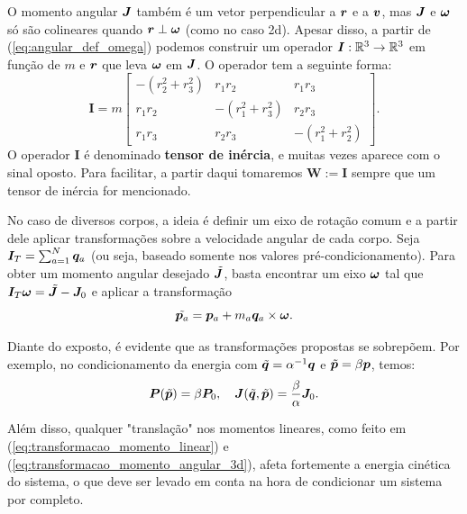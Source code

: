 O momento angular $\bm J$ também é um vetor perpendicular a $\bm r$ e a $\bm v$, mas $\bm J$ e $\bm \omega$ só são colineares quando $\bm r \perp \bm \omega$ (como no caso 2d). Apesar disso, a partir de (\ref{eq:angular_def_omega}) podemos construir um operador $\bm I: \mathbb{R}^3 \to \mathbb{R}^3$ em função de $m$ e $\bm r$ que leva $\bm \omega$ em $\bm J$. O operador tem a seguinte forma:
\begin{equation}
    \bm I = m
    \begin{bmatrix}
        - (r_2^2 + r_3^2) & r_1 r_2 & r_1 r_3 \\
        r_1 r_2 & - (r_1^2 + r_3^2) & r_2 r_3 \\
        r_1 r_3 & r_2 r_3 & - (r_1^2 + r_2^2)
    \end{bmatrix}.
\end{equation}
O operador $\bm I$ é denominado \textbf{tensor de inércia}, e muitas vezes aparece com o sinal oposto. Para facilitar, a partir daqui tomaremos $\bm W := \bm I$ sempre que um tensor de inércia for mencionado.

No caso de diversos corpos, a ideia é definir um eixo de rotação comum e a partir dele aplicar transformações sobre a velocidade angular de cada corpo. Seja $\bm I_T = \sum_{a=1}^N \bm q_a$ (ou seja, baseado somente nos valores pré-condicionamento). Para obter um momento angular desejado $\tilde{\bm J}$, basta encontrar um eixo $\bm \omega$ tal que $\bm I_T \bm \omega = \tilde{\bm J} - \bm J_0$ e aplicar a transformação 
\begin{equation}\label{eq:transformacao_momento_angular_3d}
    \tilde{\bm p_a} = \bm p_a + m_a \bm q_a \times \bm \omega.
\end{equation}

Diante do exposto, é evidente que as transformações propostas se sobrepõem. Por exemplo, no condicionamento da energia com $\tilde{\bm q} = \alpha^{-1} \bm q$ e $\tilde{\bm p} = \beta \bm p$, temos:
\begin{equation}
    \bm P(\tilde{\bm p}) = \beta \bm P_0,
    \quad
    \bm J(\tilde{\bm q}, \tilde{\bm p}) = \dfrac{\beta}{\alpha} \bm J_0.
\end{equation}

Além disso, qualquer "translação" nos momentos lineares, como feito em (\ref{eq:transformacao_momento_linear}) e (\ref{eq:transformacao_momento_angular_3d}), afeta fortemente a energia cinética do sistema, o que deve ser levado em conta na hora de condicionar um sistema por completo.
